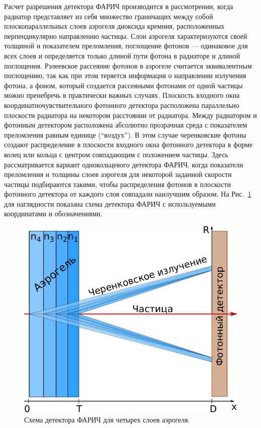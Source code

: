 \documentclass[12pt]{article}
\begin{document}
Расчет разрешения детектора ФАРИЧ производится в рассмотрении, когда радиатор представляет из себя множество граничащих между собой плоскопараллельных слоев аэрогеля диоксида кремния, 
расположенных перпендикулярно направлению частицы. Слои аэрогеля характеризуются своей толщиной и показателем преломления, поглощение фотонов --- 
одинаковое для всех слоев и определяется только длиной пути фотона в радиаторе и длиной поглощения. Рэлеевское рассеяние фотонов в аэрогеле считается эквивалентным поглощению, 
так как при этом теряется информация о направлении излучения фотона, а фоном, который создается рассеяными фотонами от одной частицы можно пренебречь в практически важных случаях. 
Плоскость входного окна координатночувствительного фотонного детектора расположена параллельно плоскости радиатора на некотором расстоянии от радиатора. 
Между радиатором и фотонным детектором расположена абсолютно прозрачная среда с показателем преломления равным единице (``воздух''). 
В этом случае черенковские фотоны создают распределение в плоскости входного окна фотонного детектора в форме колец или кольца с центром 
совпадающим с положением частицы. Здесь рассматривается вариант однокольцевого детектора ФАРИЧ, когда показатели преломления и толщины 
слоев аэрогеля для некоторой заданной скорости частицы подбираются такими, чтобы распределения фотонов в плоскости фотонного детектора от каждого слоя совпадали наилучшим образом.
На Рис.~\ref{fig:farich} для наглядности показана схема детектора ФАРИЧ с используемыми координатами и обозначениями.

\begin{figure}[h]
\begin{center}
\includegraphics[width=0.4\textheight]{farich_scheme.pdf}
\caption{\small Схема детектора ФАРИЧ для четырех слоев аэрогеля.}
\label{fig:farich}
\end{center}
\end{figure}
\end{document}
